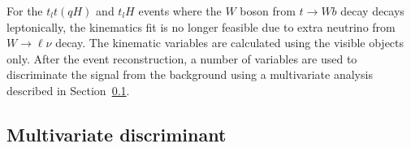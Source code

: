 For the  $t_lt(qH)$ and $t_lH$ events where the $W$ boson from $t\to W b$ decay decays leptonically,
the kinematics fit is no longer feasible due to extra neutrino from $W\rightarrow \ell\nu$ decay. The kinematic variables are calculated using the visible
objects only. After the event reconstruction, a number of variables are used to discriminate the signal from the background using a multivariate analysis described
in Section~\ref{sec:tmva}.



\subsection{Multivariate discriminant}
\label{sec:tmva}

